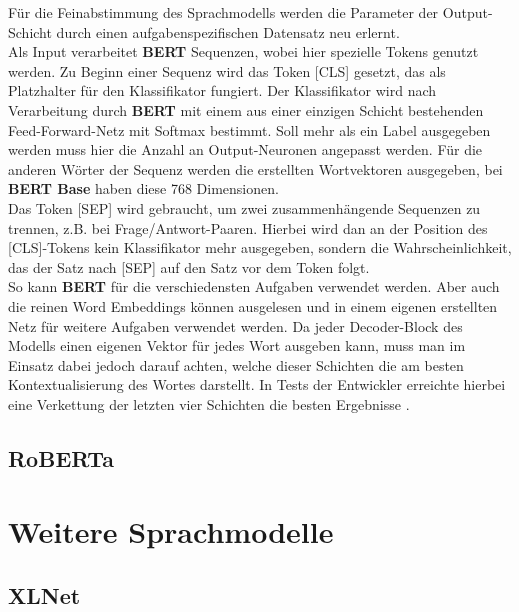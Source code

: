 F\"ur die Feinabstimmung des Sprachmodells werden die Parameter der Output-Schicht durch einen aufgabenspezifischen Datensatz neu erlernt.\\
Als Input verarbeitet \textbf{BERT} Sequenzen, wobei hier spezielle Tokens genutzt werden. Zu Beginn einer Sequenz wird das Token [CLS] gesetzt, das als Platzhalter f\"ur den Klassifikator fungiert. Der Klassifikator wird nach Verarbeitung durch \textbf{BERT} mit einem aus einer einzigen Schicht bestehenden Feed-Forward-Netz mit Softmax bestimmt. Soll mehr als ein Label ausgegeben werden muss hier die Anzahl an Output-Neuronen angepasst werden. F\"ur die anderen W\"orter der Sequenz werden die erstellten Wortvektoren ausgegeben, bei \textbf{BERT Base} haben diese 768 Dimensionen.\\
Das Token [SEP] wird gebraucht, um zwei zusammenh\"angende Sequenzen zu trennen, z.B. bei Frage/Antwort-Paaren. Hierbei wird dan an der Position des [CLS]-Tokens kein Klassifikator mehr ausgegeben, sondern die Wahrscheinlichkeit, das der Satz nach [SEP] auf den Satz vor dem Token folgt.\\
So kann \textbf{BERT} f\"ur die verschiedensten Aufgaben verwendet werden. Aber auch die reinen Word Embeddings k\"onnen ausgelesen und in einem eigenen erstellten Netz f\"ur weitere Aufgaben verwendet werden. Da jeder Decoder-Block des Modells einen eigenen Vektor f\"ur jedes Wort ausgeben kann, muss man im Einsatz dabei jedoch darauf achten, welche dieser Schichten die am besten Kontextualisierung des Wortes darstellt. In Tests der Entwickler erreichte hierbei eine Verkettung der letzten vier Schichten die besten Ergebnisse \cite{bert}.


\subsection{RoBERTa}

\section{Weitere Sprachmodelle}

\subsection{XLNet}